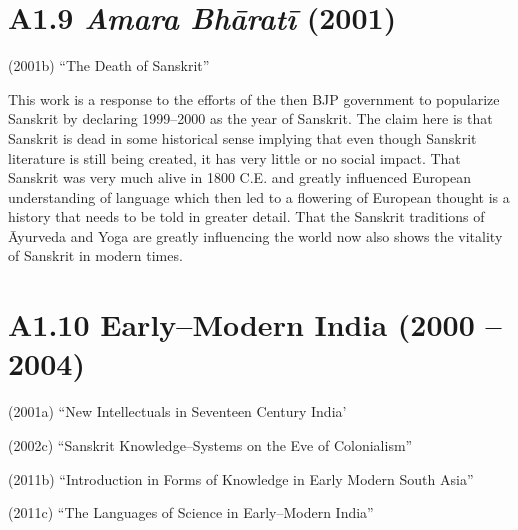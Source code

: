 \section*{A1.9 \textit{Amara Bhāratī} (2001)}

(2001b) “The Death of Sanskrit”

This work is a response to the efforts of the then BJP government to popularize Sanskrit by declaring 1999–2000 as the year of Sanskrit. The claim here is that Sanskrit is dead in some historical sense implying that even though Sanskrit literature is still being created, it has very little or no social impact. That Sanskrit was very much alive in 1800 C.E. and greatly influenced European understanding of language which then led to a flowering of European thought is a history that needs to be told in greater detail. That the Sanskrit traditions of Āyurveda and Yoga are greatly influencing the world now also shows the vitality of Sanskrit in modern times.


\section*{A1.10 Early–Modern India (2000 – 2004)}

\vspace {-.4cm}

(2001a) “New Intellectuals in Seventeen Century India’

(2002c) “Sanskrit Knowledge–Systems on the Eve of Colonialism”

(2011b) “Introduction in Forms of Knowledge in Early Modern South Asia”

(2011c) “The Languages of Science in Early–Modern India”

